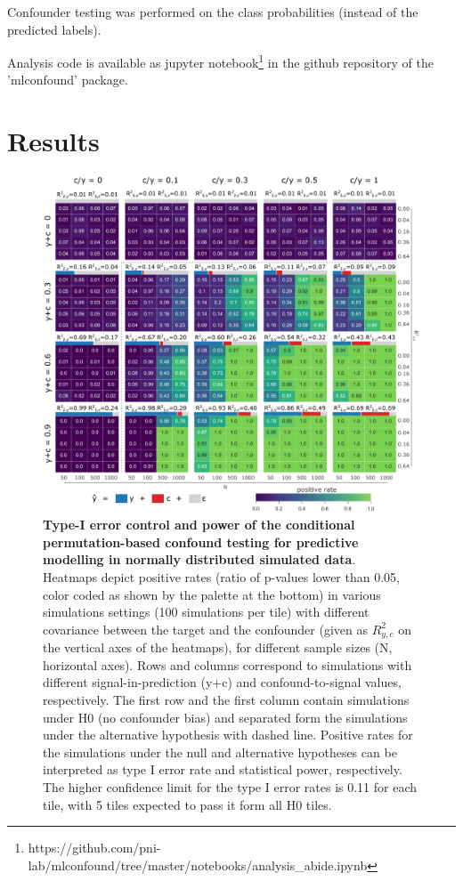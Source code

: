 \documentclass{article}
\begin{document}
Confounder testing was performed on the class probabilities (instead of the predicted labels).

Analysis code is available as jupyter notebook\footnote{https://github.com/pni-lab/mlconfound/tree/master/notebooks/analysis\_abide.ipynb} in the github repository of the 'mlconfound' package.

\section{Results}

\begin{figure}[!b]
  \centering
  \includegraphics[width=0.75\paperwidth]{fig/sim_normal.eps}
  \caption{\textbf{Type-I error control and power of the conditional permutation-based confound testing for predictive modelling in normally distributed simulated data}. \\
  Heatmaps depict positive rates (ratio of p-values lower than 0.05, color coded as shown by the palette at the bottom) in various simulations settings (100 simulations per tile) with different covariance between the target and the confounder (given as $R^2_{y,c}$ on the vertical axes of the heatmaps), for different sample sizes (N, horizontal axes).
  Rows and columns correspond to simulations with different signal-in-prediction (y+c) and confound-to-signal values, respectively. The first row and the first column contain simulations under H0 (no confounder bias) and separated form the simulations under the alternative hypothesis with dashed line. Positive rates for the simulations under the null and alternative hypotheses can be interpreted as type I error rate and statistical power, respectively. The higher confidence limit for the type I error rates is 0.11 for each tile, with 5 tiles expected to pass it form all H0 tiles.
}
\end{figure}
\end{document}
